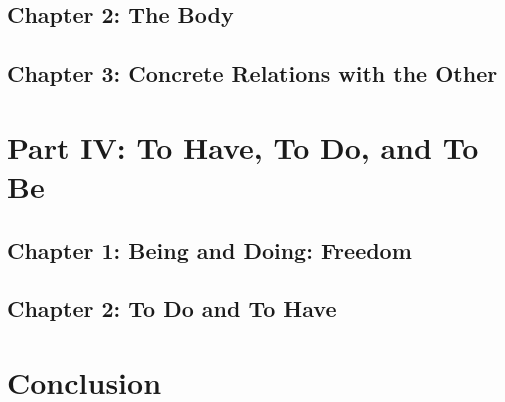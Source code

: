 \subsection{Chapter 2: The Body}

\subsection{Chapter 3: Concrete Relations with the Other}

\section{Part IV: To Have, To Do, and To Be}

\subsection{Chapter 1: Being and Doing: Freedom}

\subsection{Chapter 2: To Do and To Have}

\section{Conclusion}
